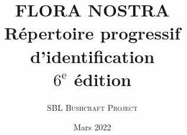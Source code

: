 \pretitle{{\vskip 2cm} \centering\huge}
\posttitle{\par\vskip 1.25cm}
\preauthor{\centering\large}
\postauthor{\par}
\predate{\par\centering\vskip 0.5cm}
\postdate{\par\vskip 1cm\vfill}

\title{%
  {\bfseries FLORA NOSTRA}\\[.25em]
  {\large Répertoire progressif d'identification}\\[.25em]
  {\Large $6^{\textrm{e}}$ édition}}
\author{{\Large\scshape SBL Bushcraft Project}}
\date{Mars 2022}

\newcommand{\mytitlepage}{%
  \pagenumbering{gobble}
   \begin{titlingpage}
     \maketitle
    \thispagestyle{plain}
     \clearpage 
         {\centering
           {\par\noindent\large\itshape
             Nomina si nescis, perit et cognitio rerum.}
           \medskip
               {\par\hfill ---Linné 1775}}
         \vfill
             {\par\noindent\large Fr. Christian Morissette \\ Fr. Luc Lamontagne \\ Ted Szylowiec \\© SBL Bushcraft Project 2022}
   \end{titlingpage}
   \pagenumbering{arabic}
}
